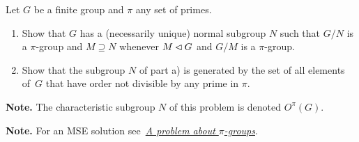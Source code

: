 \begin{probl}\label{problem-1.B.8}
    Let $G$ be a finite group and $\pi$ any set of primes.
    \begin{enumerate}[\rm a)]
    \item Show that\/ $G$ has a (necessarily unique) normal subgroup\/ $N$ such that\/ $G/N$ is a $\pi$-group and $M\supseteq N$ whenever $M\lhd G$ and $G/M$ is a $\pi$-group.
    \item Show that the subgroup\/ $N$ of part\/ {\rm a)} is generated by the set of all elements of\/~$G$ that have order not divisible by any prime in $\pi$.
    \end{enumerate}

    \textrm{\rm\textbf{Note.} The characteristic subgroup $N$ of this problem is denoted $O^\pi(G)$.}
    
    \textrm{\rm {\bf Note.} For an MSE solution see~\href{https://math.stackexchange.com/q/688412/269050}{\it A problem about $\pi$-groups}.}
\end{probl}

